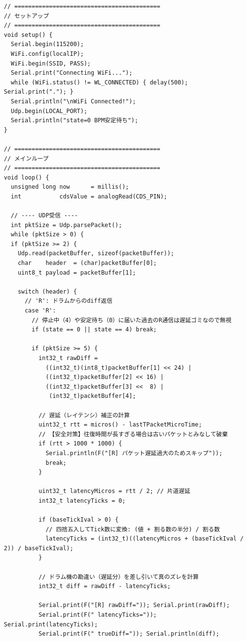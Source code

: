 \begin{lstlisting}[caption={piano\_0706.ino（楽譜データは冒頭2小節のみ掲載）}, label={lst:douki_piano_full}]
// ==========================================
// セットアップ
// ==========================================
void setup() {
  Serial.begin(115200);
  WiFi.config(localIP);
  WiFi.begin(SSID, PASS);
  Serial.print("Connecting WiFi...");
  while (WiFi.status() != WL_CONNECTED) { delay(500); Serial.print("."); }
  Serial.println("\nWiFi Connected!");
  Udp.begin(LOCAL_PORT);
  Serial.println("state=0 BPM安定待ち");
}

// ==========================================
// メインループ
// ==========================================
void loop() {
  unsigned long now      = millis();
  int           cdsValue = analogRead(CDS_PIN);

  // ---- UDP受信 ----
  int pktSize = Udp.parsePacket();
  while (pktSize > 0) {
  if (pktSize >= 2) {
    Udp.read(packetBuffer, sizeof(packetBuffer));
    char    header  = (char)packetBuffer[0];
    uint8_t payload = packetBuffer[1];

    switch (header) {
      // 'R': ドラムからのdiff返信
      case 'R':
        // 停止中（4）や安定待ち（0）に届いた過去のR通信は遅延ゴミなので無視
        if (state == 0 || state == 4) break;

        if (pktSize >= 5) {
          int32_t rawDiff =
            ((int32_t)(int8_t)packetBuffer[1] << 24) |
            ((int32_t)packetBuffer[2] << 16) |
            ((int32_t)packetBuffer[3] <<  8) |
             (int32_t)packetBuffer[4];
          
          // 遅延（レイテンシ）補正の計算
          uint32_t rtt = micros() - lastTPacketMicroTime;
          // 【安全対策】往復時間が長すぎる場合は古いパケットとみなして破棄
          if (rtt > 1000 * 1000) {
            Serial.println(F("[R] パケット遅延過大のためスキップ"));
            break; 
          }

          uint32_t latencyMicros = rtt / 2; // 片道遅延
          int32_t latencyTicks = 0;

          if (baseTickIval > 0) {
            // 四捨五入してTick数に変換: (値 + 割る数の半分) / 割る数
            latencyTicks = (int32_t)((latencyMicros + (baseTickIval / 2)) / baseTickIval);
          }

          // ドラム機の勘違い（遅延分）を差し引いて真のズレを計算
          int32_t diff = rawDiff - latencyTicks; 

          Serial.print(F("[R] rawDiff=")); Serial.print(rawDiff);
          Serial.print(F(" latencyTicks=")); Serial.print(latencyTicks);
          Serial.print(F(" trueDiff=")); Serial.println(diff);


\end{lstlisting}
